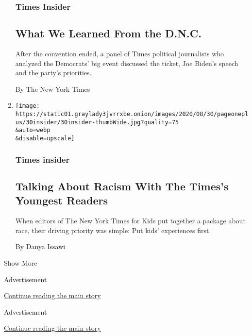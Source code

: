 \begin{enumerate}
  \hypertarget{times-insider-10}{%
  \subsubsection{Times Insider}\label{times-insider-10}}

  \hypertarget{what-we-learned-from-the-dnc}{%
  \subsection{What We Learned From the
  D.N.C.}\label{what-we-learned-from-the-dnc}}

  After the convention ended, a panel of Times political journalists who
  analyzed the Democrats' big event discussed the ticket, Joe Biden's
  speech and the party's priorities.

  By The New York Times
\item
  \href{/2020/08/28/insider/times-for-kids-race-issue.html}{}

  \texttt{[image: https://static01.graylady3jvrrxbe.onion/images/2020/08/30/pageoneplus/30insider/30insider-thumbWide.jpg?quality=75\\\&auto=webp\\\&disable=upscale]}

  \hypertarget{times-insider-11}{%
  \subsubsection{Times insider}\label{times-insider-11}}

  \hypertarget{talking-about-racism-with-the-timess-youngest-readers}{%
  \subsection{Talking About Racism With The Times's Youngest
  Readers}\label{talking-about-racism-with-the-timess-youngest-readers}}

  When editors of The New York Times for Kids put together a package
  about race, their driving priority was simple: Put kids' experiences
  first.

  By Danya Issawi
\end{enumerate}

Show More

Advertisement

\protect\hyperlink{after-mid1}{Continue reading the main story}

Advertisement

\protect\hyperlink{after-mktg}{Continue reading the main story}

